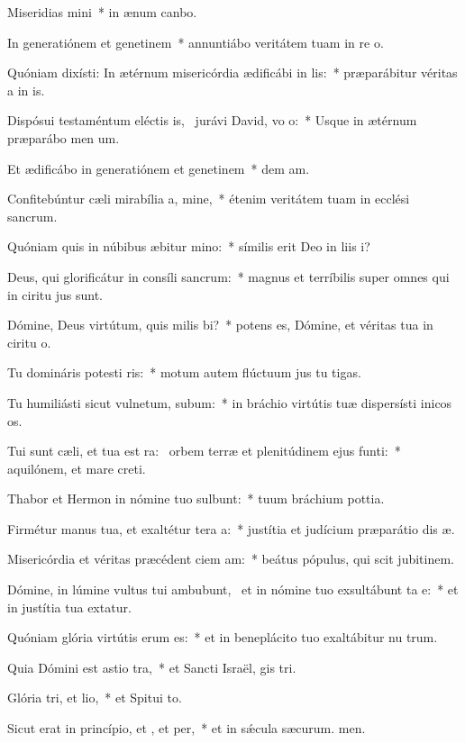 \item Miseridias mini~* in ænum canbo.
\item In generatiónem et genetinem~* annuntiábo veritátem tuam in re o.
\item Quóniam dixísti: In ætérnum misericórdia ædificábi in lis:~* præparábitur véritas a in is.
\item Dispósui testaméntum eléctis is,~\pscross{} jurávi David, vo o:~* Usque in ætérnum præparábo men um.
\item Et ædificábo in generatiónem et genetinem~* dem am.
\item Confitebúntur cæli mirabília a, mine,~* étenim veritátem tuam in ecclési sancrum.
\item Quóniam quis in núbibus æbitur mino:~* símilis erit Deo in liis i?
\item Deus, qui glorificátur in consíli sancrum:~* magnus et terríbilis super omnes qui in ciritu jus sunt.
\item Dómine, Deus virtútum, quis milis bi?~* potens es, Dómine, et véritas tua in ciritu o.
\item Tu domináris potesti ris:~* motum autem flúctuum jus tu tigas.
\item Tu humiliásti sicut vulnetum, subum:~* in bráchio virtútis tuæ dispersísti inicos os.
\item Tui sunt cæli, et tua est ra:~\pscross{} orbem terræ et plenitúdinem ejus  funti:~* aquilónem, et mare  creti.
\item Thabor et Hermon in nómine tuo sulbunt:~* tuum bráchium  pottia.
\item Firmétur manus tua, et exaltétur tera a:~* justítia et judícium præparátio dis æ.
\item Misericórdia et véritas præcédent ciem am:~* beátus pópulus, qui scit jubitinem.
\item Dómine, in lúmine vultus tui ambubunt,~\pscross{} et in nómine tuo exsultábunt ta e:~* et in justítia tua extatur.
\item Quóniam glória virtútis erum  es:~* et in beneplácito tuo exaltábitur nu trum.
\item Quia Dómini est astio tra,~* et Sancti Israël, gis tri.
\item Glória tri, et lio,~* et Spitui to.
\item Sicut erat in princípio, et , et per,~* et in sǽcula sæcurum. men.
